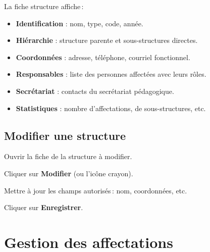 La fiche structure affiche\,:
\begin{itemize}
  \item \textbf{Identification} : nom, type, code, ann\'ee.
  \item \textbf{Hi\'erarchie} : structure parente et sous-structures directes.
  \item \textbf{Coordonn\'ees} : adresse, t\'el\'ephone, courriel fonctionnel.
  \item \textbf{Responsables} : liste des personnes affect\'ees avec leurs r\^oles.
  \item \textbf{Secr\'etariat} : contacts du secr\'etariat p\'edagogique.
  \item \textbf{Statistiques} : nombre d'affectations, de sous-structures, etc.
\end{itemize}


\subsection{Modifier une structure}

\begin{steps}
  \item Ouvrir la fiche de la structure \`a modifier.
  \item Cliquer sur \textbf{Modifier} (ou l'ic\^one crayon).
  \item Mettre \`a jour les champs autoris\'es\,: nom, coordonn\'ees, etc.
  \item Cliquer sur \textbf{Enregistrer}.
\end{steps}


\section{Gestion des affectations}

